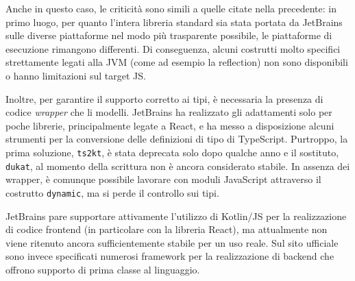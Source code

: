       Anche in questo caso, le criticità sono simili a quelle citate nella  precedente:
      in primo luogo, per quanto l'intera libreria standard sia stata portata da JetBrains sulle diverse piattaforme nel modo più trasparente possibile, le piattaforme di esecuzione rimangono differenti.
      Di conseguenza, alcuni costrutti molto specifici strettamente legati alla JVM (come ad esempio la reflection) non sono disponibili o hanno limitazioni sul target JS\@.

      Inoltre, per garantire il supporto corretto ai tipi, è necessaria la presenza di codice \emph{wrapper} che li modelli.
      JetBrains ha realizzato gli adattamenti solo per poche librerie, principalmente legate a React, e ha messo a disposizione alcuni strumenti per la conversione delle definizioni di tipo di TypeScript.
      Purtroppo, la prima soluzione, \texttt{ts2kt}, è stata deprecata solo dopo qualche anno e il sostituto, \texttt{dukat}, al momento della scrittura non è ancora considerato stabile.
      In assenza dei wrapper, è comunque possibile lavorare con moduli JavaScript attraverso il costrutto \texttt{dynamic}, ma si perde il controllo sui tipi.

      JetBrains pare supportare attivamente l'utilizzo di Kotlin/JS per la realizzazione di codice frontend (in particolare con la libreria React), ma attualmente non viene ritenuto ancora sufficientemente stabile per un uso reale.
      Sul sito ufficiale sono invece specificati numerosi framework per la realizzazione di backend che offrono supporto di prima classe al linguaggio.
